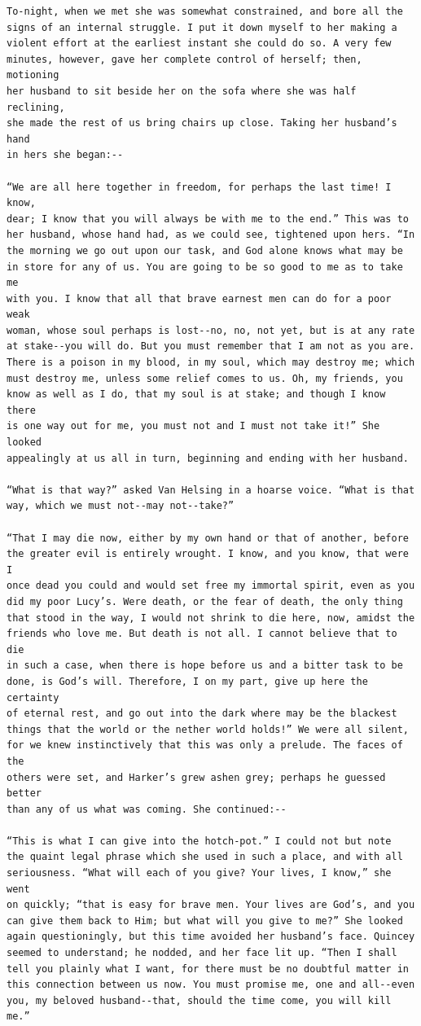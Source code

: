 \documentclass{article}
\begin{document}
\begin{verbatim}
To-night, when we met she was somewhat constrained, and bore all the
signs of an internal struggle. I put it down myself to her making a
violent effort at the earliest instant she could do so. A very few
minutes, however, gave her complete control of herself; then, motioning
her husband to sit beside her on the sofa where she was half reclining,
she made the rest of us bring chairs up close. Taking her husband’s hand
in hers she began:--

“We are all here together in freedom, for perhaps the last time! I know,
dear; I know that you will always be with me to the end.” This was to
her husband, whose hand had, as we could see, tightened upon hers. “In
the morning we go out upon our task, and God alone knows what may be
in store for any of us. You are going to be so good to me as to take me
with you. I know that all that brave earnest men can do for a poor weak
woman, whose soul perhaps is lost--no, no, not yet, but is at any rate
at stake--you will do. But you must remember that I am not as you are.
There is a poison in my blood, in my soul, which may destroy me; which
must destroy me, unless some relief comes to us. Oh, my friends, you
know as well as I do, that my soul is at stake; and though I know there
is one way out for me, you must not and I must not take it!” She looked
appealingly at us all in turn, beginning and ending with her husband.

“What is that way?” asked Van Helsing in a hoarse voice. “What is that
way, which we must not--may not--take?”

“That I may die now, either by my own hand or that of another, before
the greater evil is entirely wrought. I know, and you know, that were I
once dead you could and would set free my immortal spirit, even as you
did my poor Lucy’s. Were death, or the fear of death, the only thing
that stood in the way, I would not shrink to die here, now, amidst the
friends who love me. But death is not all. I cannot believe that to die
in such a case, when there is hope before us and a bitter task to be
done, is God’s will. Therefore, I on my part, give up here the certainty
of eternal rest, and go out into the dark where may be the blackest
things that the world or the nether world holds!” We were all silent,
for we knew instinctively that this was only a prelude. The faces of the
others were set, and Harker’s grew ashen grey; perhaps he guessed better
than any of us what was coming. She continued:--

“This is what I can give into the hotch-pot.” I could not but note
the quaint legal phrase which she used in such a place, and with all
seriousness. “What will each of you give? Your lives, I know,” she went
on quickly; “that is easy for brave men. Your lives are God’s, and you
can give them back to Him; but what will you give to me?” She looked
again questioningly, but this time avoided her husband’s face. Quincey
seemed to understand; he nodded, and her face lit up. “Then I shall
tell you plainly what I want, for there must be no doubtful matter in
this connection between us now. You must promise me, one and all--even
you, my beloved husband--that, should the time come, you will kill me.”


\end{verbatim}
\end{document}
